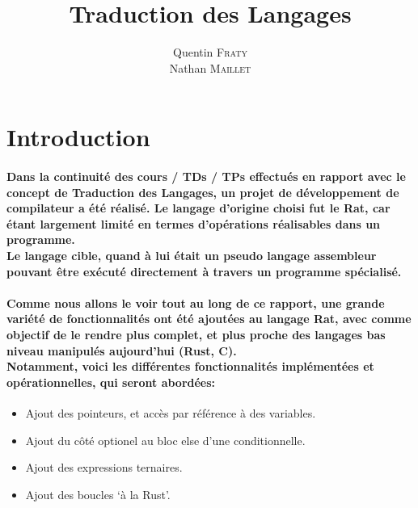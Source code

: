 \documentclass[french]{article}
\begin{document}
\title{\textbf{Traduction des Langages}}
\author{Quentin \textsc{Fraty}\\
        Nathan \textsc{Maillet}}
\date{}

\maketitle


\section{Introduction}
\paragraph{Dans la continuité des cours / TDs / TPs effectués en rapport avec le concept de Traduction des Langages, un projet de développement de compilateur
a été réalisé. Le langage d'origine choisi fut le Rat, car étant largement limité en termes d'opérations réalisables dans un programme.\\
Le langage cible, quand à lui était un pseudo langage assembleur pouvant être exécuté directement à travers un programme spécialisé.}
\paragraph{Comme nous allons le voir tout au long de ce rapport, une grande variété de fonctionnalités ont été ajoutées au langage Rat,
avec comme objectif de le rendre plus complet, et plus proche des langages bas niveau manipulés aujourd'hui (Rust, C).\\
Notamment, voici les différentes fonctionnalités implémentées et opérationnelles, qui seront abordées:}
\begin{itemize}
        \item Ajout des pointeurs, et accès par référence à des variables.
        \item Ajout du côté optionel au bloc else d'une conditionnelle.
        \item Ajout des expressions ternaires.
        \item Ajout des boucles `à la Rust'.
\end{itemize}
\end{document}
